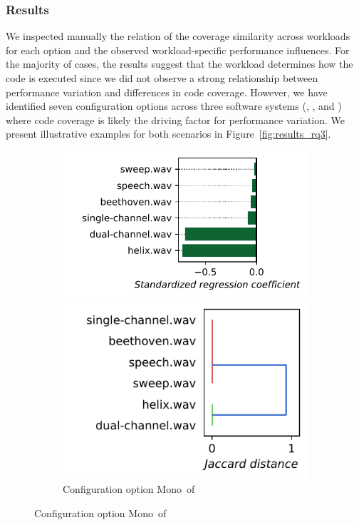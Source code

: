 \subsubsection{Results}
We inspected manually the relation of the coverage similarity across workloads for each option and the observed workload-specific performance influences.  For the majority of cases, the results suggest that the workload determines how the code is executed since we did not observe a strong relationship between performance variation and differences in code coverage. However, we have identified seven configuration options across three software systems (\jumper, \kanzi, and \dconvert)  where code coverage is likely the driving factor for performance variation. We present illustrative examples for both scenarios in Figure~\ref{fig:results_rq3}.
\begin{figure}
	\centering
	\begin{subfigure}{0.99\linewidth}
		\begin{minipage}{0.5\linewidth}
			\includegraphics[width=\linewidth]{images/plots/jump3r_Mono_influences.pdf}
		\end{minipage}
		\begin{minipage}{0.5\linewidth}
			\includegraphics[width=0.8\linewidth]{images/plots/jump3r_Mono_workloads.pdf}
		\end{minipage}
		\caption{Configuration option \guillemotleft\textsf{Mono}\guillemotright~of \jumper}
		\label{fig:results_rq3_jump3r}
	\end{subfigure}
	

\end{figure}
